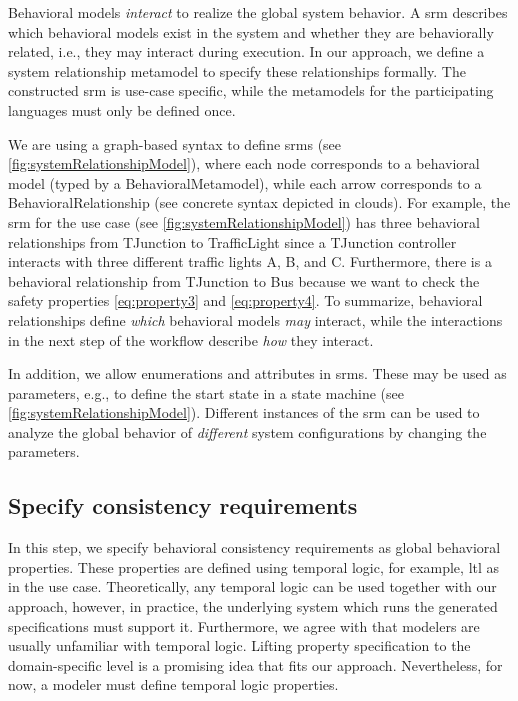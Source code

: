\documentclass{jot}
\begin{document}
Behavioral models \textit{interact} to realize the global system behavior.
A \gls*{srm} describes which behavioral models exist in the system and whether they are behaviorally related, i.e., they may interact during execution.
In our approach, we define a system relationship metamodel to specify these relationships formally.
The constructed \gls*{srm} is use-case specific, while the metamodels for the participating languages must only be defined once.

We are using a graph-based syntax to define \gls*{srm}s (see \cref{fig:systemRelationshipModel}), where each node corresponds to a behavioral model (typed by a \textsf{BehavioralMetamodel}), while each arrow corresponds to a \textsf{BehavioralRelationship} (see concrete syntax depicted in clouds).
For example, the \gls*{srm} for the use case (see \cref{fig:systemRelationshipModel}) has three behavioral relationships from \textsf{TJunction} to \textsf{TrafficLight} since a TJunction controller interacts with three different traffic lights A, B, and C.
Furthermore, there is a behavioral relationship from \textsf{TJunction} to \textsf{Bus} because we want to check the safety properties \eqref{eq:property3} and \eqref{eq:property4}. 
To summarize, behavioral relationships define \textit{which} behavioral models \textit{may} interact, while the interactions in the next step of the workflow describe \textit{how} they interact.

In addition, we allow enumerations and attributes in \gls*{srm}s.
These may be used as parameters, e.g., to define the start state in a state machine (see \cref{fig:systemRelationshipModel}).
Different instances of the \gls*{srm} can be used to analyze the global behavior of \textit{different} system configurations by changing the parameters.

\subsection{Specify consistency requirements} \label{subsec:specify_consistency_requirements}
In this step, we specify behavioral consistency requirements as global behavioral properties.
These properties are defined using temporal logic, for example, \gls*{ltl} as in the use case.
Theoretically, any temporal logic can be used together with our approach, however, in practice, the underlying system which runs the generated specifications must support it.
Furthermore, we agree with \cite{meyersProMoBoxFrameworkGenerating2014} that modelers are usually unfamiliar with temporal logic.
Lifting property specification to the domain-specific level is a promising idea that fits our approach.
Nevertheless, for now, a modeler must define temporal logic properties.
\end{document}
